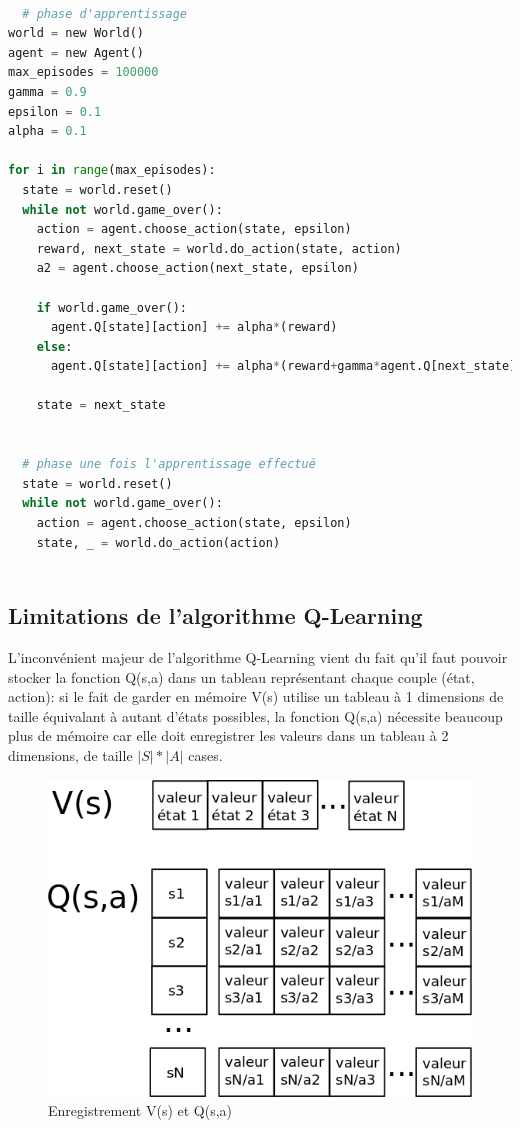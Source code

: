 \documentclass[11pt,a4paper]{report}
\begin{document}
   \begin{lstlisting}[language=python]
 
  # phase d'apprentissage
world = new World()
agent = new Agent()
max_episodes = 100000
gamma = 0.9
epsilon = 0.1
alpha = 0.1
  
for i in range(max_episodes):
  state = world.reset()
  while not world.game_over():
    action = agent.choose_action(state, epsilon)
    reward, next_state = world.do_action(state, action)
    a2 = agent.choose_action(next_state, epsilon)
    
    if world.game_over(): 
      agent.Q[state][action] += alpha*(reward)
    else:
      agent.Q[state][action] += alpha*(reward+gamma*agent.Q[next_state][a2])

    state = next_state
    
        
  # phase une fois l'apprentissage effectué
  state = world.reset()
  while not world.game_over():
    action = agent.choose_action(state, epsilon)
    state, _ = world.do_action(action)
        
   \end{lstlisting} 
    
  \subsection{Limitations de l'algorithme Q-Learning}
    
    \par L'inconvénient majeur de l'algorithme Q-Learning vient du fait qu'il faut pouvoir stocker la fonction Q(s,a) dans un tableau représentant chaque couple (état, action): si le fait de garder en mémoire V(s) utilise un tableau à 1 dimensions de taille équivalant à autant d'états possibles, la fonction Q(s,a) nécessite beaucoup plus de mémoire car elle doit enregistrer les valeurs dans un tableau à 2 dimensions, de taille $|S| * |A|$ cases. 
    
    \begin{figure}[!h]
    \center
    \includegraphics[scale=0.45]{ressources/v_s_vs_q_sa.png}
    \caption{Enregistrement V(s) et Q(s,a)}
    \end{figure} 
    
\end{document}

